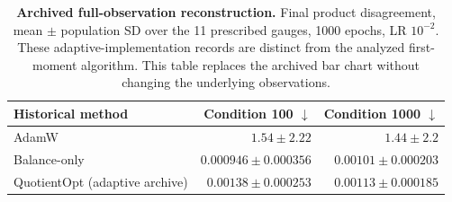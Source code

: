 \begin{table}[t]
\centering\small
\renewcommand{\arraystretch}{1.18}\setlength{\tabcolsep}{5pt}
\caption{\textbf{Archived full-observation reconstruction.} Final product disagreement, mean $\pm$ population SD over the 11 prescribed gauges, 1000 epochs, LR $10^{-2}$. These adaptive-implementation records are distinct from the analyzed first-moment algorithm. This table replaces the archived bar chart without changing the underlying observations.}
\label{fig:gauge}
\begin{tabular}{@{}lrr@{}}
\toprule
Historical method & Condition 100 $\downarrow$ & Condition 1000 $\downarrow$\\
\midrule
AdamW & $1.54\pm2.22$ & $1.44\pm2.2$\\
Balance-only & $0.000946\pm0.000356$ & $0.00101\pm0.000203$\\
\rowcolor{oursbg}QuotientOpt (adaptive archive) & $0.00138\pm0.000253$ & $0.00113\pm0.000185$\\
\bottomrule
\end{tabular}
\end{table}
